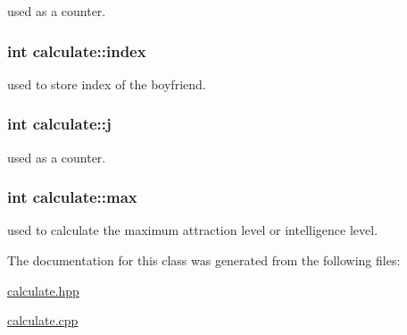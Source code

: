 used as a counter. 

\hypertarget{classcalculate_a7c2b95b41f956840477c3e8c76ca4ea4}{
\subsubsection[{index}]{\setlength{\rightskip}{0pt plus 5cm}int calculate\-::index}}\label{classcalculate_a7c2b95b41f956840477c3e8c76ca4ea4}


used to store index of the boyfriend. 

\hypertarget{classcalculate_aba966e9d5f8f31a432200721dfdb0c70}{
\subsubsection[{j}]{\setlength{\rightskip}{0pt plus 5cm}int calculate\-::j}}\label{classcalculate_aba966e9d5f8f31a432200721dfdb0c70}


used as a counter. 

\hypertarget{classcalculate_a8d0c1aad864e4dbf7383dfaa5793092b}{
\subsubsection[{max}]{\setlength{\rightskip}{0pt plus 5cm}int calculate\-::max}}\label{classcalculate_a8d0c1aad864e4dbf7383dfaa5793092b}


used to calculate the maximum attraction level or intelligence level. 



The documentation for this class was generated from the following files\-:\begin{DoxyCompactItemize}
\item 
\hyperlink{calculate_8hpp}{calculate.\-hpp}\item 
\hyperlink{calculate_8cpp}{calculate.\-cpp}\end{DoxyCompactItemize}
